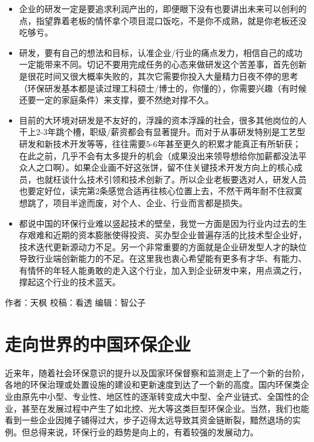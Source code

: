 \documentclass[
]{book}
\begin{document}
\begin{itemize}
\item
  企业的研发一定是要追求利润产出的，即便眼下没有也要讲出未来可以创利的点，指望靠着老板的情怀拿个项目混口饭吃，不是你不成熟，就是你老板还没吃够亏。
\item
  研发，要有自己的想法和目标，认准企业/行业的痛点发力，相信自己的成功一定能带来不同。切记不要用完成任务的心态来做研发这个苦差事，首先创新是很花时间又很大概率失败的，其次它需要你投入大量精力日夜不停的思考（环保研发基本都是读过理工科硕士/博士的，你懂的），你需要兴趣（有时候还要一定的家庭条件）来支撑，要不然绝对撑不久。
\item
  目前的大环境对研发是不友好的，浮躁的资本浮躁的社会，很多其他岗位的人干上2-3年跳个槽，职级/薪资都会有显著提升。而对于从事研发特别是工艺型研发和新技术开发等等，往往需要5-6年甚至更久的积累才能真正有所斩获；在此之前，几乎不会有太多提升的机会（成果没出来领导想给你加薪都没法平众人之口啊）。如果企业画不好这张饼，留不住关键技术开发方向上的核心成员，也就枉谈什么技术引领和技术创新了。所以企业老板要选对人，研发人员也要定好位，读完第2条感觉合适再往核心位置上去，不然干两年耐不住寂寞想跳了，项目半途而废，对个人、企业、行业而言都是损失。
\item
  都说中国的环保行业难以竖起技术的壁垒，我觉一方面是因为行业内过去的生存艰难和近期的资本膨胀使得投资、买办型企业普遍存活的比技术型企业好，技术迭代更新源动力不足。另一个非常重要的方面就是企业研发型人才的缺位导致行业端创新能力的不足。在这里我也衷心希望能有更多有才华、有能力、有情怀的年轻人能勇敢的走入这个行业，加入到企业研发中来，用点滴之行，撑起这个行业的技术蓝天。
\end{itemize}

作者：天枫
校稿：看透
编辑：智公子

\hypertarget{ux8d70ux5411ux4e16ux754cux7684ux4e2dux56fdux73afux4fddux4f01ux4e1a}{%
\section{走向世界的中国环保企业}\label{ux8d70ux5411ux4e16ux754cux7684ux4e2dux56fdux73afux4fddux4f01ux4e1a}}

近来年，随着社会环保意识的提升以及国家环保督察和监测走上了一个新的台阶，各地的环保治理或处置设施的建设和更新速度到达了一个新的高度。国内环保类企业由原先中小型、专业性、地区性的逐渐转变成大中型、全产业链式、全国性的企业，甚至在发展过程中产生了如北控、光大等这类巨型环保企业。当然，我们也能看到一些企业因摊子铺得过大，步子迈得太远导致其资金链断裂，黯然退场的实例。但总得来说，环保行业的趋势是向上的，有着较强的发展动力。
\end{document}
